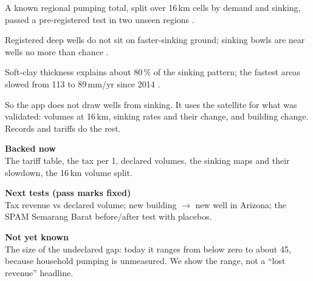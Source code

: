 \begin{tcbraster}[raster columns=3,raster equal height,raster column skip=3mm,raster before skip=1mm,raster after skip=0mm]
\begin{tcolorbox}[tile=greensoft]
A known regional pumping total, split over 16\,km cells by demand and sinking, passed a pre-registered test
in two unseen regions \cite{exp09}.
\end{tcolorbox}
\begin{tcolorbox}[tile=warmsoft]
Registered deep wells do not sit on faster-sinking ground; sinking bowls are near wells no more than chance
\cite{exp13}.
\end{tcolorbox}
\begin{tcolorbox}[tile=greensoft]
Soft-clay thickness explains about 80\,\% of the sinking pattern; the fastest areas slowed from 113 to
89\,mm/yr since 2014 \cite{exp14}.
\end{tcolorbox}
\end{tcbraster}

\vspace{1mm}
{\sffamily\footnotesize So the app does not draw wells from sinking. It uses the satellite for what was
validated: volumes at 16\,km, sinking rates and their change, and building change. Records and tariffs
do the rest.\par}

\begin{tcbraster}[raster columns=3,raster equal height,raster column skip=3mm,raster before skip=1mm,raster after skip=0mm]
\begin{tcolorbox}[tile=greensoft]
\textbf{\color{green}Backed now}\\[1pt]
The tariff table, the tax per 1\Mm, declared volumes, the sinking maps and their slowdown, the 16\,km volume split.
\end{tcolorbox}
\begin{tcolorbox}[tile=accentsoft]
\textbf{\color{accent}Next tests (pass marks fixed)}\\[1pt]
Tax revenue vs declared volume; new building $\rightarrow$ new well in Arizona; the SPAM Semarang Barat
before/after test with placebos.
\end{tcolorbox}
\begin{tcolorbox}[tile=warmsoft]
\textbf{\color{warm}Not yet known}\\[1pt]
The size of the undeclared gap: today it ranges from below zero to about 45\Mmyr, because household
pumping is unmeasured. We show the range, not a ``lost revenue'' headline.
\end{tcolorbox}
\end{tcbraster}

